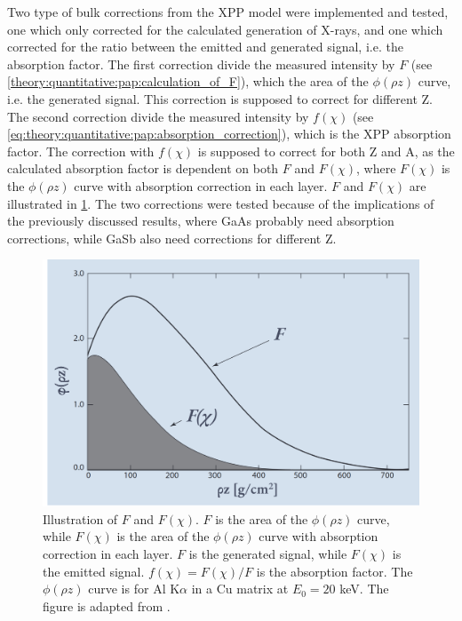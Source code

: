 Two type of bulk corrections from the XPP model were implemented and tested, one which only corrected for the calculated generation of X-rays, and one which corrected for the ratio between the emitted and generated signal, i.e. the absorption factor.
The first correction divide the measured intensity by $F$ (see \cref{theory:quantitative:pap:calculation_of_F}), which the area of the $\phi(\rho z)$ curve, i.e. the generated signal.
This correction is supposed to correct for different Z.
The second correction divide the measured intensity by $f(\chi)$ (see \cref{eq:theory:quantitative:pap:absorption_correction}), which is the XPP absorption factor.
The correction with $f(\chi)$ is supposed to correct for both Z and A, as the calculated absorption factor is dependent on both $F$ and $F(\chi)$, where $F(\chi)$ is the $\phi(\rho z)$ curve with absorption correction in each layer.
$F$ and $F(\chi)$ are illustrated in \cref{fig:discussion:pap:F_and_Fchi}.
The two corrections were tested because of the implications of the previously discussed results, where GaAs probably need absorption corrections, while GaSb also need corrections for different Z.

\begin{figure}[htbp]
    \centering
    \includegraphics[width=0.8\linewidth]{figures/discussion/xpp_absorption_correction.png}
    \caption{
        Illustration of $F$ and $F(\chi)$.
        $F$ is the area of the $\phi(\rho z)$ curve, while $F(\chi)$ is the area of the $\phi(\rho z)$ curve with absorption correction in each layer.
        $F$ is the generated signal, while $F(\chi)$ is the emitted signal.
        $f(\chi) = F(\chi) / F$ is the absorption factor.
        The $\phi(\rho z)$ curve is for Al K$\alpha$ in a Cu matrix at $E_0 = 20$ keV.
        The figure is adapted from \cite[Fig. 19.14]{goldstein_scanning_2018}.
    }
    \label{fig:discussion:pap:F_and_Fchi}
\end{figure}


